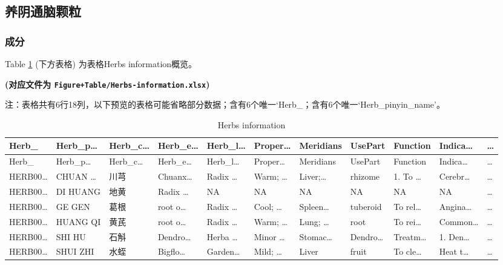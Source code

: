 \documentclass[
]{article}
\begin{document}
\hypertarget{ux517bux9634ux901aux8111ux9897ux7c92}{%
\subsection{养阴通脑颗粒}\label{ux517bux9634ux901aux8111ux9897ux7c92}}

\hypertarget{ux6210ux5206}{%
\subsubsection{成分}\label{ux6210ux5206}}

Table \ref{tab:Herbs-information} (下方表格) 为表格Herbs information概览。

\textbf{(对应文件为 \texttt{Figure+Table/Herbs-information.xlsx})}

\begin{center}\begin{tcolorbox}[colback=gray!10, colframe=gray!50, width=0.9\linewidth, arc=1mm, boxrule=0.5pt]注：表格共有6行18列，以下预览的表格可能省略部分数据；含有6个唯一`Herb\_；含有6个唯一`Herb\_pinyin\_name'。
\end{tcolorbox}
\end{center}

\begin{longtable}[]{@{}lllllllllll@{}}
\caption{\label{tab:Herbs-information}Herbs information}\tabularnewline
\toprule
Herb\_ & Herb\_p\ldots{} & Herb\_c\ldots{} & Herb\_e\ldots{} & Herb\_l\ldots{} & Proper\ldots{} & Meridians & UsePart & Function & Indica\ldots{} & \ldots{}\tabularnewline
\midrule
\endfirsthead
\toprule
Herb\_ & Herb\_p\ldots{} & Herb\_c\ldots{} & Herb\_e\ldots{} & Herb\_l\ldots{} & Proper\ldots{} & Meridians & UsePart & Function & Indica\ldots{} & \ldots{}\tabularnewline
\midrule
\endhead
HERB00\ldots{} & CHUAN \ldots{} & 川芎 & Chuanx\ldots{} & Radix \ldots{} & Warm; \ldots{} & Liver;\ldots{} & rhizome & 1. To \ldots{} & Cerebr\ldots{} & \ldots{}\tabularnewline
HERB00\ldots{} & DI HUANG & 地黄 & Radix \ldots{} & NA & NA & NA & NA & NA & NA & \ldots{}\tabularnewline
HERB00\ldots{} & GE GEN & 葛根 & root o\ldots{} & Radix \ldots{} & Cool; \ldots{} & Spleen\ldots{} & tuberoid & To rel\ldots{} & Angina\ldots{} & \ldots{}\tabularnewline
HERB00\ldots{} & HUANG QI & 黄芪 & root o\ldots{} & Radix \ldots{} & Warm; \ldots{} & Lung; \ldots{} & root & To rei\ldots{} & Common\ldots{} & \ldots{}\tabularnewline
HERB00\ldots{} & SHI HU & 石斛 & Dendro\ldots{} & Herba \ldots{} & Minor \ldots{} & Stomac\ldots{} & Dendro\ldots{} & Treatm\ldots{} & 1. Den\ldots{} & \ldots{}\tabularnewline
HERB00\ldots{} & SHUI ZHI & 水蛭 & Bigflo\ldots{} & Garden\ldots{} & Mild; \ldots{} & Liver & fruit & To cle\ldots{} & Heat t\ldots{} & \ldots{}\tabularnewline
\bottomrule
\end{longtable}
\end{document}
